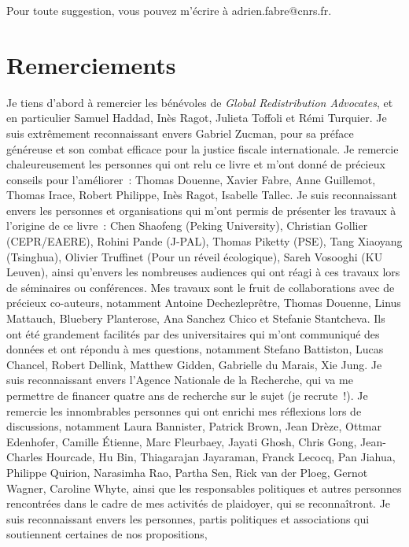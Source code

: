 \documentclass[a5paper,french,openany]{memoir}
\begin{document}
Pour toute suggestion, vous pouvez m'écrire à adrien.fabre@cnrs.fr.

\renewcommand{\url}[1]{\href{#1}{Lien}} %
{\small 

}

\clearpage
\section*{Remerciements}\label{sec:merci} 
Je tiens d'abord à remercier les bénévoles de \textit{Global Redistribution Advocates}, et en particulier Samuel Haddad, Inès Ragot, Julieta Toffoli et Rémi Turquier. Je suis extrêmement reconnaissant envers Gabriel Zucman, pour sa préface généreuse et son combat efficace pour la justice fiscale internationale. Je remercie chaleureusement les personnes qui ont relu ce livre et m'ont donné de précieux conseils pour l'améliorer~: Thomas Douenne, Xavier Fabre, Anne Guillemot, Thomas Irace, Robert Philippe, Inès Ragot, Isabelle Tallec. Je suis reconnaissant envers les personnes et organisations qui m'ont permis de présenter les travaux à l'origine de ce livre~: Chen Shaofeng (Peking University), Christian Gollier (CEPR/EAERE), Rohini Pande (J-PAL), Thomas Piketty (PSE), Tang Xiaoyang (Tsinghua), Olivier Truffinet (Pour un réveil écologique), Sareh Vosooghi (KU Leuven), ainsi qu'envers les nombreuses audiences qui ont réagi à ces travaux lors de séminaires ou conférences. Mes travaux sont le fruit de collaborations avec de précieux co-auteurs, notamment Antoine Dechezleprêtre, Thomas Douenne, Linus Mattauch, Bluebery Planterose, Ana Sanchez Chico et Stefanie Stantcheva. 
Ils ont été grandement facilités par des universitaires qui m'ont communiqué des données et ont répondu à mes questions, notamment Stefano Battiston, Lucas Chancel, Robert Dellink, Matthew Gidden, Gabrielle du Marais, Xie Jung. %
Je suis reconnaissant envers l'Agence Nationale de la Recherche, qui va me permettre de financer quatre ans de recherche sur le sujet (je recrute~!). Je remercie les innombrables personnes qui ont enrichi mes réflexions lors de discussions, notamment Laura Bannister, Patrick Brown, Jean Drèze, Ottmar Edenhofer, Camille Étienne, Marc Fleurbaey, Jayati Ghosh, Chris Gong, Jean-Charles Hourcade, Hu Bin, Thiagarajan Jayaraman, Franck Lecocq, Pan Jiahua, Philippe Quirion, Narasimha Rao, Partha Sen, Rick van der Ploeg, Gernot Wagner, Caroline Whyte, ainsi que les responsables politiques et autres personnes rencontrées dans le cadre de mes activités de plaidoyer, qui se reconnaîtront. Je suis reconnaissant envers les personnes, partis politiques et associations qui soutiennent certaines de nos propositions, 
\end{document}
